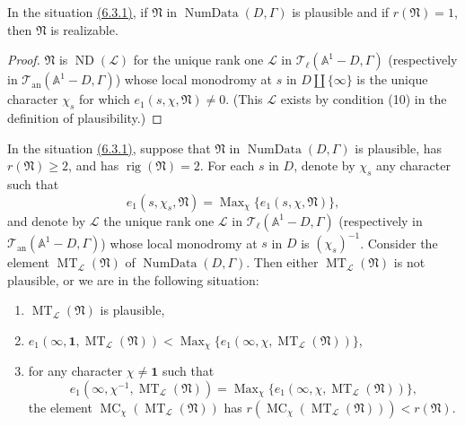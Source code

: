 In the situation \hyperref[par:6.3.1]{(6.3.1)}, if \(\mathfrak{N}\) in \(\operatorname{NumData}(D,\Gamma)\) is plausible and if \(r(\mathfrak{N})=1\), then \(\mathfrak{N}\) is realizable.
\begin{proof}
\(\mathfrak{N}\) is \(\operatorname{ND}(\mathcal{L})\) for the unique rank one \(\mathcal{L}\) in \(\mathcal{T}_\ell(\mathbb{A}^1-D,\Gamma)\) (respectively in \(\mathcal{T}_{\mathrm{an}}(\mathbb{A}^1-D,\Gamma)\)) whose local monodromy at \(s\) in \(D\amalg\{\infty\}\) is the unique character \(\chi_s\) for which \(e_1(s,\chi,\mathfrak{N})\ne 0\). (This \(\mathcal{L}\) exists by condition (10) in the definition of plausibility.)
\end{proof}

In the situation \hyperref[par:6.3.1]{(6.3.1)}, suppose that \(\mathfrak{N}\) in \(\operatorname{NumData}(D,\Gamma)\) is plausible, has \(r(\mathfrak{N})\geq 2\), and has \(\operatorname{rig}(\mathfrak{N})=2\). For each \(s\) in \(D\), denote by \(\chi_s\) any character such that
\[
e_1(s,\chi_s,\mathfrak{N})=\operatorname{Max}_\chi\{e_1(s,\chi,\mathfrak{N})\},
\]
and denote by \(\mathcal{L}\) the unique rank one \(\mathcal{L}\) in \(\mathcal{T}_\ell(\mathbb{A}^1-D,\Gamma)\) (respectively in \(\mathcal{T}_{\mathrm{an}}(\mathbb{A}^1-D,\Gamma)\)) whose local monodromy at \(s\) in \(D\) is \((\chi_s)^{-1}\). Consider the element \(\operatorname{MT}_{\mathcal{L}}(\mathfrak{N})\) of \(\operatorname{NumData}(D,\Gamma)\). Then either \(\operatorname{MT}_{\mathcal{L}}(\mathfrak{N})\) is not plausible, or we are in the following situation:
\begin{enumerate}[label=(\arabic*)]
\item \(\operatorname{MT}_{\mathcal{L}}(\mathfrak{N})\) is plausible,
\item \(e_1(\infty,\mathbf{1},\operatorname{MT}_{\mathcal{L}}(\mathfrak{N}))<\operatorname{Max}_\chi\{e_1(\infty,\chi,\operatorname{MT}_{\mathcal{L}}(\mathfrak{N}))\}\),
\item for any character \(\chi\ne\mathbf{1}\) such that
\[
e_1(\infty,\chi^{-1},\operatorname{MT}_{\mathcal{L}}(\mathfrak{N}))=\operatorname{Max}_\chi\{e_1(\infty,\chi,\operatorname{MT}_{\mathcal{L}}(\mathfrak{N}))\},
\]
the element \(\operatorname{MC}_\chi(\operatorname{MT}_{\mathcal{L}}(\mathfrak{N}))\) has \(r(\operatorname{MC}_\chi(\operatorname{MT}_{\mathcal{L}}(\mathfrak{N})))<r(\mathfrak{N})\).
\end{enumerate}
